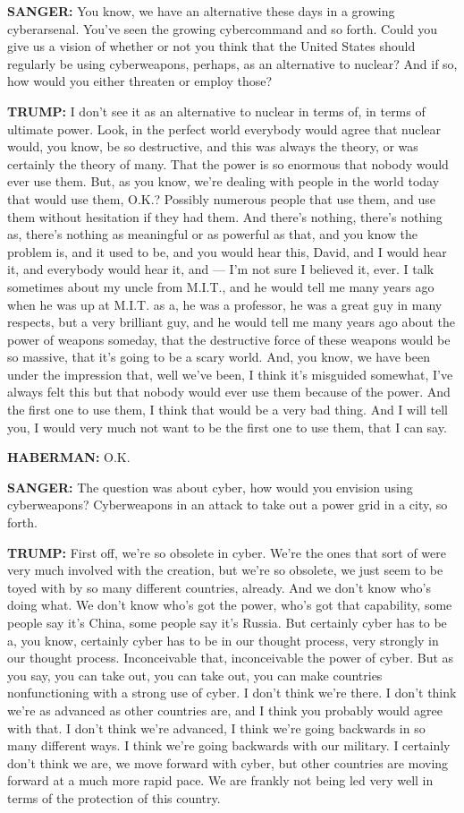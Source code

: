 \textbf{SANGER:} You know, we have an alternative these days in a
growing cyberarsenal. You've seen the growing cybercommand and so forth.
Could you give us a vision of whether or not you think that the United
States should regularly be using cyberweapons, perhaps, as an
alternative to nuclear? And if so, how would you either threaten or
employ those?

\textbf{TRUMP:} I don't see it as an alternative to nuclear in terms of,
in terms of ultimate power. Look, in the perfect world everybody would
agree that nuclear would, you know, be so destructive, and this was
always the theory, or was certainly the theory of many. That the power
is so enormous that nobody would ever use them. But, as you know, we're
dealing with people in the world today that would use them, O.K.?
Possibly numerous people that use them, and use them without hesitation
if they had them. And there's nothing, there's nothing as, there's
nothing as meaningful or as powerful as that, and you know the problem
is, and it used to be, and you would hear this, David, and I would hear
it, and everybody would hear it, and --- I'm not sure I believed it,
ever. I talk sometimes about my uncle from M.I.T., and he would tell me
many years ago when he was up at M.I.T. as a, he was a professor, he was
a great guy in many respects, but a very brilliant guy, and he would
tell me many years ago about the power of weapons someday, that the
destructive force of these weapons would be so massive, that it's going
to be a scary world. And, you know, we have been under the impression
that, well we've been, I think it's misguided somewhat, I've always felt
this but that nobody would ever use them because of the power. And the
first one to use them, I think that would be a very bad thing. And I
will tell you, I would very much not want to be the first one to use
them, that I can say.

\textbf{HABERMAN:} O.K.

\textbf{SANGER:} The question was about cyber, how would you envision
using cyberweapons? Cyberweapons in an attack to take out a power grid
in a city, so forth.

\textbf{TRUMP:} First off, we're so obsolete in cyber. We're the ones
that sort of were very much involved with the creation, but we're so
obsolete, we just seem to be toyed with by so many different countries,
already. And we don't know who's doing what. We don't know who's got the
power, who's got that capability, some people say it's China, some
people say it's Russia. But certainly cyber has to be a, you know,
certainly cyber has to be in our thought process, very strongly in our
thought process. Inconceivable that, inconceivable the power of cyber.
But as you say, you can take out, you can take out, you can make
countries nonfunctioning with a strong use of cyber. I don't think we're
there. I don't think we're as advanced as other countries are, and I
think you probably would agree with that. I don't think we're advanced,
I think we're going backwards in so many different ways. I think we're
going backwards with our military. I certainly don't think we are, we
move forward with cyber, but other countries are moving forward at a
much more rapid pace. We are frankly not being led very well in terms of
the protection of this country.

